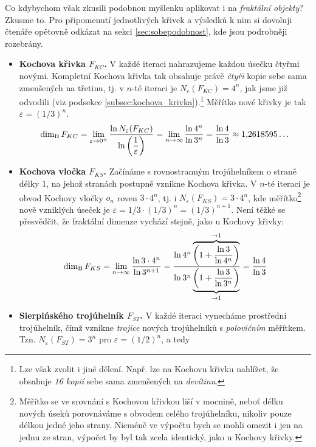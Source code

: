 Co kdybychom však zkusili podobnou myšlenku aplikovat i na \emph{fraktální objekty}? Zkusme to. Pro připomenutí jednotlivých křivek a výsledků k nim si dovoluji čtenáře opětovně odkázat na sekci \ref{sec:sobepodobnost}, kde jsou podrobněji rozebrány.
\begin{itemize}
    \item \textbf{Kochova křivka $F_{KC}$.} V každé iteraci nahrazujeme každou úsečku čtyřmi novými. Kompletní Kochova křivka tak obsahuje právě \emph{čtyři} kopie sebe sama zmenšených na třetinu, tj. v $n$-té iteraci je $N_\varepsilon(F_{KC})=4^n$, jak jsme již odvodili (viz podsekce \ref{subsec:kochova_krivka}).\footnote{Lze však zvolit i jiné dělení. Např. lze na Kochovu křivku nahlížet, že obsahuje \emph{16 kopií} sebe sama zmenšených na \emph{devítinu}.} Měřítko nové křivky je tak $\varepsilon=(1/3)^n$.
    \begin{equation}\label{eq:kochova-krivka-dimenze}
        \operatorname{dim_B}{F_{KC}}=\lim_{\varepsilon\to 0^+}{\dfrac{\ln{N_\varepsilon(F_{KC})}}{\ln{\left(\dfrac{1}{\varepsilon}\right)}}}=\lim_{n\to\infty}{\dfrac{\ln{4^n}}{\ln{3^n}}}=\dfrac{\ln{4}}{\ln{3}}\approx 1{,}2618595\dots
    \end{equation}
    \item \textbf{Kochova vločka $F_{KS}$.} Začínáme s rovnostranným trojúhelníkem o straně délky $1$, na jehož stranách postupně vznikne Kochova křivka. V $n$-té iteraci je obvod Kochovy vločky $o_n$ roven $3\cdot 4^n$, tj. i $N_\varepsilon(F_{KS})=3\cdot 4^n$, kde měřítko\footnote{Měřítko se ve srovnání s Kochovou křivkou liší v mocnině, neboť délku nových úseků porovnáváme s obvodem celého trojúhelníku, nikoliv pouze délkou jedné jeho strany. Nicméně ve výpočtu bych se mohli omezit i jen na jednu ze stran, výpočet by byl tak zcela identický, jako u Kochovy křivky.} nově vzniklých úseček je $\varepsilon=1/3\cdot(1/3)^n=(1/3)^{n+1}$. Není těžké se přesvědčit, že fraktální dimenze vychází stejně, jako u Kochovy křivky:
    \begin{equation}\label{eq:kochova-vlocka-dimenze}
        \operatorname{dim_B}{F_{KS}}=\lim_{n\to\infty}{\dfrac{\ln{3\cdot 4^n}}{\ln{3^{n+1}}}}=\dfrac{\ln{4^n}\overbrace{\left(1+\dfrac{\ln{3}}{\ln{4^n}}\right)}^{\to 1}}{\ln{3^n}\underbrace{\left(1+\dfrac{\ln{3}}{\ln{3^n}}\right)}_{\to 1}}=\dfrac{\ln{4}}{\ln{3}}
    \end{equation}
    \item \textbf{Sierpińského trojúhelník $F_{ST}$.} V každé iteraci vynecháme prostřední trojúhelník, čímž vznikne \emph{trojice} nových trojúhelníků s \emph{polovičním} měřítkem. Tzn. $N_\varepsilon(F_{ST})=3^n$ pro $\varepsilon=(1/2)^n$, a tedy

\end{itemize}
